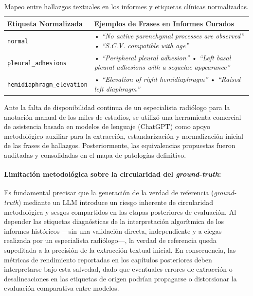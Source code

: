 \documentclass[../tesis.tex]{subfiles}
\begin{document}
\begin{table}[htbp]
\centering
\small
\begin{tabular}{|l|p{8.5cm}|}
\hline
\textbf{Etiqueta Normalizada} & \textbf{Ejemplos de Frases en Informes Curados} \\ \hline
\texttt{normal} & 
• \textit{``No active parenchymal processes are observed''} \newline
• \textit{``S.C.V. compatible with age''} \\ \hline
\texttt{pleural\_adhesions} & 
• \textit{``Peripheral pleural adhesion''} \newline
• \textit{``Left basal pleural adhesions with a sequelae appearance''} \\ \hline
\texttt{hemidiaphragm\_elevation} & 
• \textit{``Elevation of right hemidiaphragm''} \newline
• \textit{``Raised left diaphragm''} \\ \hline
\end{tabular}
\caption{Mapeo entre hallazgos textuales en los informes y etiquetas clínicas normalizadas.}
\label{tab:mapping_ejemplos}
\end{table}


Ante la falta de disponibilidad continua de un especialista radiólogo para la anotación manual de los miles de estudios, se utilizó una herramienta comercial de asistencia basada en modelos de lenguaje (ChatGPT) como apoyo metodológico auxiliar para la extracción, estandarización y normalización inicial de las frases de hallazgos. Posteriormente, las equivalencias propuestas fueron auditadas y consolidadas en el mapa de patologías definitivo.

\paragraph{Limitación metodológica sobre la circularidad del \textit{ground-truth}:} Es fundamental precisar que la generación de la verdad de referencia (\textit{ground-truth}) mediante un LLM introduce un riesgo inherente de circularidad metodológica y sesgos compartidos en las etapas posteriores de evaluación. Al depender las etiquetas diagnósticas de la interpretación algorítmica de los informes históricos —sin una validación directa, independiente y a ciegas realizada por un especialista radiólogo—, la verdad de referencia queda supeditada a la precisión de la extracción textual inicial. En consecuencia, las métricas de rendimiento reportadas en los capítulos posteriores deben interpretarse bajo esta salvedad, dado que eventuales errores de extracción o desalineaciones en las etiquetas de origen podrían propagarse o distorsionar la evaluación comparativa entre modelos.
\end{document}
